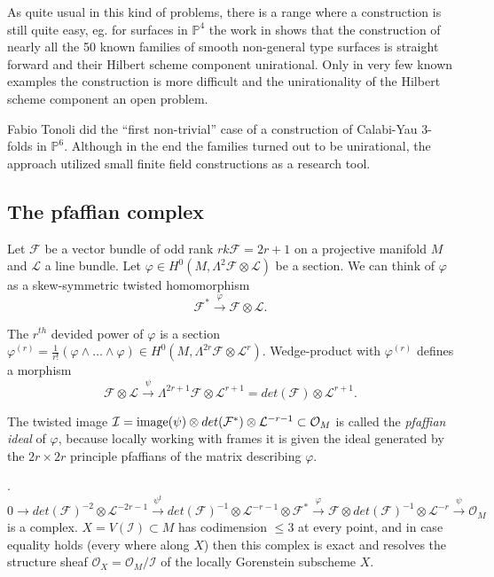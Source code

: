 \documentclass[12pt,leqno]{amsart}
\newcommand{\PP}{{\mathbb P}}
\newcommand{\image}{{\rm{image}}}
\newcommand{\kf}{{\mathcal F}}
\newcommand{\ki}{{\mathcal I}}
\newcommand{\kl}{{\mathcal L}}
\newcommand{\ko}{{\mathcal O}}
\newcommand{\tensor}{\otimes}
\newlength{\ho}
\begin{document}
As quite usual in this kind of problems, there is a range where a 
construction is still quite easy, 
eg. for surfaces in $\PP^4$ the work in \cite{DES,Po} 
shows that the construction of nearly all the 50 known families 
of smooth non-general type surfaces is straight forward 
and their Hilbert scheme component unirational. 
Only in very few known examples the construction is more difficult
and the unirationality of the Hilbert scheme component an open problem.

Fabio Tonoli did the ``first non-trivial'' case of a construction of 
Calabi-Yau 3-folds in $\PP^6$. 
Although in the end the families  turned out to be unirational, 
the approach utilized small finite field constructions as a research tool.




\subsection{The pfaffian complex}

Let $\kf$ be a vector bundle of odd rank $rk \kf = 2r+1$ on a projective
manifold $M$ and $\kl$ a line bundle. Let $\varphi 
\in H^0(M,\Lambda^2 \kf \otimes \kl)$ be a section. We can 
think of $\varphi$ as a skew-symmetric twisted homomorphism
$$\kf^* \stackrel{\varphi}{\longrightarrow} \kf \otimes \kl.$$
 
The $r^{th}$ devided power of $\varphi$ is a section
$\varphi^{(r)} = \frac{1}{r!}(\varphi \wedge \dots \wedge \varphi) \in 
H^0(M,\Lambda^{2r}\kf \otimes \kl^r)$. Wedge-product with $\varphi^{(r)}$ 
defines a morphism 
$$ \kf \tensor \kl \stackrel{\psi}{\longrightarrow}  \Lambda^{2r+1} \kf \otimes \kl^{r+1}=det(\kf)\tensor\kl^{r+1}.$$

The  twisted image 
$\ki = \image(\psi) \tensor det(\kf^*) \tensor \kl^{-r-1} \subset \ko_M$
is called the {\sl pfaffian ideal} of $\varphi$, because locally working
with frames it is given  the ideal generated by the  $2r\times 2r$ principle
pfaffians of the matrix describing $\varphi$.

\begin{theorem} \cite{BE}.
$$  0 \to det(\kf)^{-2}\tensor\kl^{-2r-1}
\stackrel{\psi^t}{\longrightarrow} det(\kf)^{-1}\tensor\kl^{-r-1}\tensor \kf^* 
\stackrel{\varphi}{\longrightarrow} \kf \tensor det(\kf)^{-1}\tensor 
\kl^{-r} \stackrel{\psi}{\longrightarrow} \ko_M $$
is a complex. 
$X=V(\ki) \subset M$ has codimension $\le 3$ at every point, and in case equality
holds (every where along $X$) then 
this complex is exact and resolves the structure sheaf $\ko_X=\ko_M/\ki$ 
of the  locally Gorenstein subscheme $X$. 
\end{theorem}
\end{document}
